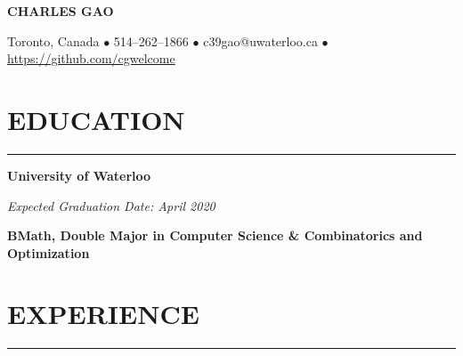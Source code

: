 \documentclass[9pt]{extarticle}
\begin{document}
\begin{center}
\textbf{\huge{CHARLES GAO}}

Toronto, Canada $\bullet$ 514--262--1866 $\bullet$ c39gao@uwaterloo.ca
$\bullet$ \href{https://github.com/cgwelcome}{https://github.com/cgwelcome }
\end{center}

\section*{\large{EDUCATION}}
\rule[1em]{\textwidth}{0.3pt}
\begin{minipage}[t]{0.6\linewidth}
\begin{flushleft}
\textbf{University of Waterloo}
\end{flushleft}
\end{minipage}
\begin{minipage}[t]{0.39\linewidth}
\begin{flushright}
\textit{Expected Graduation Date: April 2020}
\end{flushright}
\end{minipage}

\textbf{BMath,
Double Major in Computer Science \& Combinatorics and Optimization}

\vfill

\section*{\large{EXPERIENCE}}
\rule[1em]{\textwidth}{0.3pt}
\end{document}
